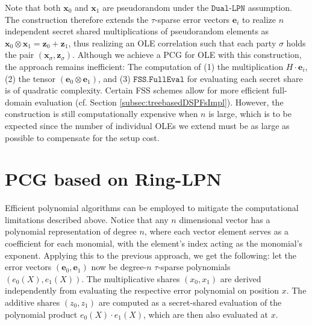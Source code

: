 Note that both $\mathbf{x}_0$ and $\mathbf{x}_1$ are pseudorandom under the $\texttt{Dual-LPN}$ assumption. The construction therefore extends the $\tau$-sparse error vectors $\mathbf{e}_i$ to realize $n$ independent secret shared multiplications of pseudorandom elements as $\mathbf{x}_0\otimes\mathbf{x}_1=\mathbf{z}_0+\mathbf{z}_1$, thus realizing an OLE correlation such that each party $\sigma$ holds the pair $(\mathbf{x}_\sigma, \mathbf{z}_\sigma)$. Although we achieve a PCG for OLE with this construction, the approach remains inefficient: The computation of (1) the multiplication $H\cdot \mathbf{e}_i$, (2) the tensor $(\mathbf{e}_0 \otimes \mathbf{e}_1)$, and (3) $\texttt{FSS.FullEval}$ for evaluating each secret share is of quadratic complexity. Certain FSS schemes allow for more efficient full-domain evaluation (cf. Section \ref{subsec:treebasedDSPFsImpl}). However, the construction is still computationally expensive when $n$ is large, which is to be expected since the number of individual OLEs we extend must be as large as possible to compensate for the setup cost.

\section{PCG based on Ring-LPN}
\label{subsec:imrpoved_pcg}
Efficient polynomial algorithms can be employed to mitigate the computational limitations described above. Notice that any $n$ dimensional vector has a polynomial representation of degree \(n\), where each vector element serves as a coefficient for each monomial, with the element's index acting as the monomial's exponent. Applying this to the previous approach, we get the following: let the error vectors $(\mathbf{e}_0, \mathbf{e}_1)$ now be degree-$n$ $\tau$-sparse polynomials $(e_0(X), e_1(X))$. The multiplicative shares $(x_0, x_1)$ are derived independently from evaluating the respective error polynomial on position $x$. The additive shares $(z_0, z_1)$ are computed as a secret-shared evaluation of the polynomial product $e_0(X)\cdot e_1(X)$, which are then also evaluated at $x$.

